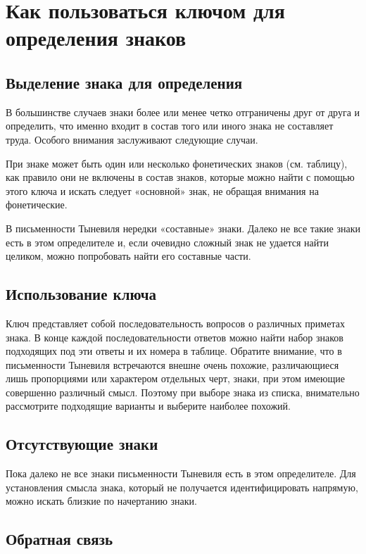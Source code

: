 \documentclass{article}
\begin{document}
 

\section{Как пользоваться ключом для определения знаков}

\subsection{Выделение знака для определения}

В большинстве случаев знаки более или менее четко отграничены друг от друга и определить, что именно входит в состав того или иного знака не составляет труда. Особого внимания заслуживают следующие случаи. 

При знаке может быть один или несколько фонетических знаков (см. таблицу), как правило они не включены в состав знаков, которые можно найти с помощью этого ключа и искать следует «основной» знак, не обращая внимания на фонетические.

В письменности Тыневиля нередки «составные» знаки. Далеко не все такие знаки есть в этом определителе и, если очевидно сложный знак не удается найти целиком, можно попробовать найти его составные части. 

\subsection{Использование ключа}

Ключ представляет собой последовательность вопросов о различных приметах знака. В конце каждой последовательности ответов можно найти набор знаков подходящих под эти ответы и их номера в таблице. Обратите внимание, что в письменности Тыневиля встречаются внешне очень похожие, различающиеся лишь пропорциями или характером отдельных черт, знаки, при этом имеющие совершенно различный смысл. Поэтому при выборе знака из списка, внимательно рассмотрите подходящие варианты и выберите наиболее похожий.

\subsection{Отсутствующие знаки}

Пока далеко не все знаки письменности Тыневиля есть в этом определителе. Для установления смысла знака, который не получается идентифицировать напрямую, можно искать близкие по начертанию знаки.

\subsection{Обратная связь}
\end{document}
